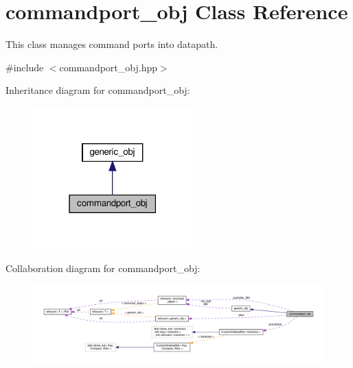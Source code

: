 \hypertarget{classcommandport__obj}{}\section{commandport\+\_\+obj Class Reference}
\label{classcommandport__obj}


This class manages command ports into datapath.  




{\ttfamily \#include $<$commandport\+\_\+obj.\+hpp$>$}



Inheritance diagram for commandport\+\_\+obj\+:
\nopagebreak
\begin{figure}[H]
\begin{center}
\leavevmode
\includegraphics[width=174pt]{df/da7/classcommandport__obj__inherit__graph}
\end{center}
\end{figure}


Collaboration diagram for commandport\+\_\+obj\+:
\nopagebreak
\begin{figure}[H]
\begin{center}
\leavevmode
\includegraphics[width=350pt]{db/d54/classcommandport__obj__coll__graph}
\end{center}
\end{figure}
